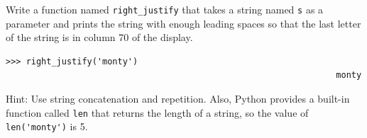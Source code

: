 \documentclass[10pt]{book}
\begin{document}
\begin{exercise}

Write a function named \verb"right_justify" that takes a string
named {\tt s} as a parameter and prints the string with enough
leading spaces so that the last letter of the string is in column 70
of the display.

\begin{verbatim}
>>> right_justify('monty')
                                                                 monty
\end{verbatim}

Hint: Use string concatenation and repetition.  Also,
Python provides a built-in function called {\tt len} that
returns the length of a string, so the value of \verb"len('monty')" is 5.

\end{exercise}
\end{document}
